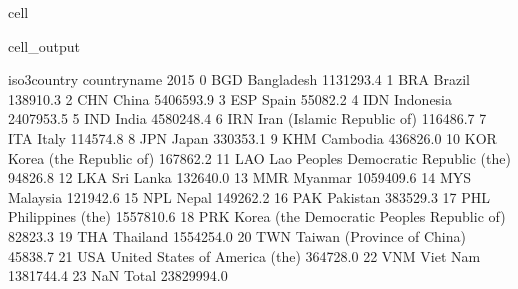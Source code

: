\documentclass[letterpaper,10pt,english]{jupyterBook}
\begin{document}
\begin{sphinxuseclass}{cell}
\begin{sphinxVerbatimOutput}
\begin{sphinxuseclass}{cell_output}
\begin{sphinxVerbatim}[commandchars=\\\{\}]
   iso3\PYGZus{}country                                 country\PYGZus{}name        2015  \PYGZbs{}
0           BGD                                   Bangladesh   1131293.4   
1           BRA                                       Brazil    138910.3   
2           CHN                                        China   5406593.9   
3           ESP                                        Spain     55082.2   
4           IDN                                    Indonesia   2407953.5   
5           IND                                        India   4580248.4   
6           IRN                   Iran (Islamic Republic of)    116486.7   
7           ITA                                        Italy    114574.8   
8           JPN                                        Japan    330353.1   
9           KHM                                     Cambodia    436826.0   
10          KOR                      Korea (the Republic of)    167862.2   
11          LAO       Lao People\PYGZsq{}s Democratic Republic (the)     94826.8   
12          LKA                                    Sri Lanka    132640.0   
13          MMR                                      Myanmar   1059409.6   
14          MYS                                     Malaysia    121942.6   
15          NPL                                        Nepal    149262.2   
16          PAK                                     Pakistan    383529.3   
17          PHL                            Philippines (the)   1557810.6   
18          PRK  Korea (the Democratic People\PYGZsq{}s Republic of)     82823.3   
19          THA                                     Thailand   1554254.0   
20          TWN                   Taiwan (Province of China)     45838.7   
21          USA               United States of America (the)    364728.0   
22          VNM                                     Viet Nam   1381744.4   
23          NaN                                        Total  23829994.0   


\end{sphinxVerbatim}
\end{sphinxuseclass}
\end{sphinxVerbatimOutput}
\end{sphinxuseclass}
\end{document}
